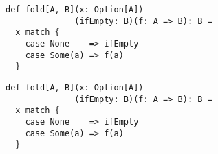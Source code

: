 \documentclass[include/preamble.tex]{subfiles}
\begin{document}
\begin{frame}[fragile]
  \begin{center}
    \begin{lstlisting}[style=scala]
def fold[A, B](x: Option[A])
              (ifEmpty: B)(f: A => B): B =
  x match {
    case None    => ifEmpty
    case Some(a) => f(a)
  }
    \end{lstlisting}
  \end{center}
\end{frame}

\begin{frame}[fragile]
  \begin{center}
    \begin{lstlisting}[style=scala]
def fold[A, B](x: Option[A])
              (ifEmpty: B)(f: A => B): B =
  x match {
    case None    => ifEmpty
    case Some(a) => f(a)
  }
    \end{lstlisting}
  \end{center}
\end{frame}
\end{document}
